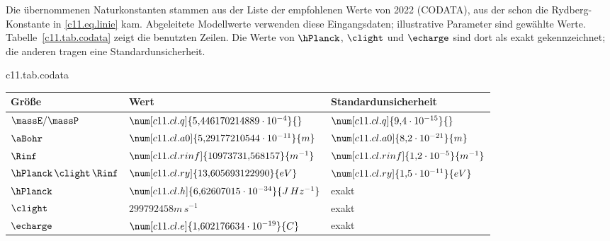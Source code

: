 \begin{vertiefung}[id=c11.v4,
    titel={Wie genau sind die Zahlen?},
    wozu={Der Kern gibt Energien und Wellenlängen auf wenige Stellen an. Hier stehen
      die Eingangsdaten, die vollen Ergebnisse und die Auskunft, wie viele ihrer Stellen
      etwas bedeuten.},
    voraussetzung={Kern~\ref{c11.s4} und \ref{c11.s6}. Nicht nötig für
      Abschnitt~\ref{c11.s7}.},
    zurueck={Die Rechnung ist auf viele Stellen genau. Was diese Stellen physikalisch
      bedeuten, entscheidet das Modell, nicht die Arithmetik.}]
  Die übernommenen Naturkonstanten stammen aus der Liste der empfohlenen Werte von
  2022 (CODATA), aus der schon die Rydberg-Konstante in \eqref{c11.eq.linie} kam.
  Abgeleitete Modellwerte verwenden diese Eingangsdaten; illustrative Parameter sind
  gewählte Werte. Tabelle~\ref{c11.tab.codata} zeigt die benutzten Zeilen. Die Werte von $\hPlanck$, $\clight$ und $\echarge$ sind
  dort als exakt gekennzeichnet; die anderen tragen eine Standardunsicherheit.

  \begin{tpctable}{c11.tab.codata}
    \caption{Eingangsdaten: Wert und Standardunsicherheit, wie sie in der Liste stehen.}
    \begin{tabular}{lll}
      \toprule
      Größe & Wert & Standardunsicherheit \\
      \midrule
      $\massE/\massP$ & $\num[c11.cl.q]{5{,}446170214889 \cdot 10^{-4}}{}$
        & $\num[c11.cl.q]{9{,}4 \cdot 10^{-15}}{}$ \\
      $\aBohr$ & $\num[c11.cl.a0]{5{,}29177210544 \cdot 10^{-11}}{m}$
        & $\num[c11.cl.a0]{8{,}2 \cdot 10^{-21}}{m}$ \\
      $\Rinf$ & $\num[c11.cl.rinf]{10973731{,}568157}{m^{-1}}$
        & $\num[c11.cl.rinf]{1{,}2 \cdot 10^{-5}}{m^{-1}}$ \\
      $\hPlanck\,\clight\,\Rinf$ & $\num[c11.cl.ry]{13{,}605693122990}{eV}$
        & $\num[c11.cl.ry]{1{,}5 \cdot 10^{-11}}{eV}$ \\
      $\hPlanck$ & $\num[c11.cl.h]{6{,}62607015 \cdot 10^{-34}}{J\,Hz^{-1}}$ & exakt \\
      $\clight$ & $\num[c11.cl.c]{299792458}{m\,s^{-1}}$ & exakt \\
      $\echarge$ & $\num[c11.cl.e]{1{,}602176634 \cdot 10^{-19}}{C}$ & exakt \\
      \bottomrule
    \end{tabular}
  \end{tpctable}


\end{vertiefung}
